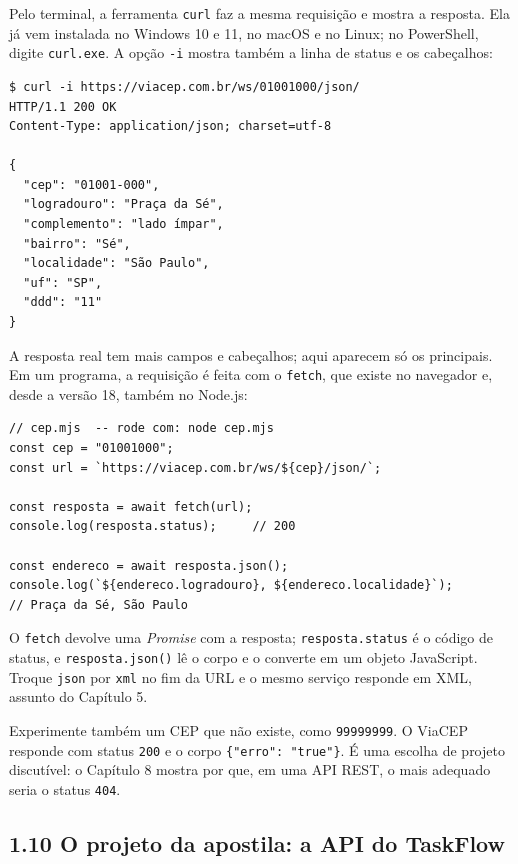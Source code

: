 Pelo terminal, a ferramenta \texttt{curl} faz a mesma requisição e mostra a resposta. Ela já vem instalada no Windows 10 e 11, no macOS e no Linux; no PowerShell, digite \texttt{curl.exe}. A opção \texttt{-i} mostra também a linha de status e os cabeçalhos:

\begin{codigo}
\begin{Verbatim}[breaklines=true, breaksymbolleft={}, fontsize=\footnotesize]
$ curl -i https://viacep.com.br/ws/01001000/json/
HTTP/1.1 200 OK
Content-Type: application/json; charset=utf-8

{
  "cep": "01001-000",
  "logradouro": "Praça da Sé",
  "complemento": "lado ímpar",
  "bairro": "Sé",
  "localidade": "São Paulo",
  "uf": "SP",
  "ddd": "11"
}
\end{Verbatim}
\end{codigo}

A resposta real tem mais campos e cabeçalhos; aqui aparecem só os principais. Em um programa, a requisição é feita com o \texttt{fetch}, que existe no navegador e, desde a versão 18, também no Node.js:

\begin{codigo}
\begin{Verbatim}[breaklines=true, breaksymbolleft={}, fontsize=\footnotesize]
// cep.mjs  -- rode com: node cep.mjs
const cep = "01001000";
const url = `https://viacep.com.br/ws/${cep}/json/`;

const resposta = await fetch(url);
console.log(resposta.status);     // 200

const endereco = await resposta.json();
console.log(`${endereco.logradouro}, ${endereco.localidade}`);
// Praça da Sé, São Paulo
\end{Verbatim}
\end{codigo}

O \texttt{fetch} devolve uma \textit{Promise} com a resposta; \texttt{resposta.status} é o código de status, e \texttt{resposta.json()} lê o corpo e o converte em um objeto JavaScript. Troque \texttt{json} por \texttt{xml} no fim da URL e o mesmo serviço responde em XML, assunto do Capítulo 5.

Experimente também um CEP que não existe, como \texttt{99999999}. O ViaCEP responde com status \texttt{200} e o corpo \texttt{\{"erro": "true"\}}. É uma escolha de projeto discutível: o Capítulo 8 mostra por que, em uma API REST, o mais adequado seria o status \texttt{404}.

\subsection{1.10 O projeto da apostila: a API do TaskFlow}

